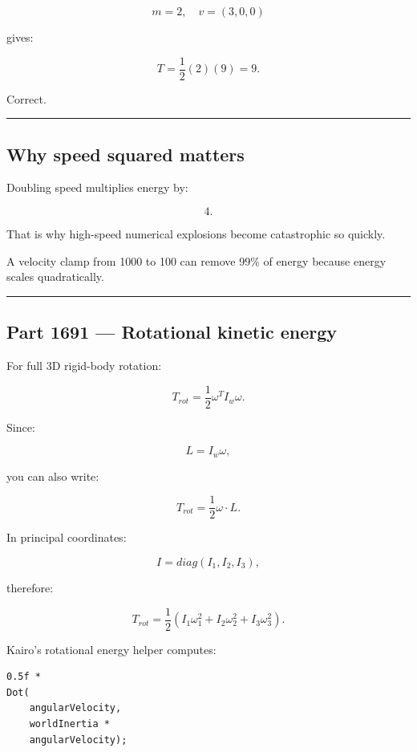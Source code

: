 \[
m=2,
\quad
v=(3,0,0)
\]

gives:

\[
T=
\frac12(2)(9)=9.
\]

Correct.

\begin{center}\rule{0.5\linewidth}{0.5pt}\end{center}

\subsection{Why speed squared matters}\label{06-engine-ii-ch039-why-speed-squared-matters}

Doubling speed multiplies energy by:

\[
4.
\]

That is why high-speed numerical explosions become catastrophic so quickly.

A velocity clamp from 1000 to 100 can remove 99\% of energy because energy scales quadratically.

\begin{center}\rule{0.5\linewidth}{0.5pt}\end{center}

\subsection{Part 1691 --- Rotational kinetic energy}\label{06-engine-ii-ch039-part-1691-rotational-kinetic-energy}

For full 3D rigid-body rotation:

\[
\boxed{
T_{rot}
=
\frac12
\omega^T
I_w
\omega.
}
\]

Since:

\[
L=I_w\omega,
\]

you can also write:

\[
\boxed{
T_{rot}
=
\frac12
\omega\cdot L.
}
\]

In principal coordinates:

\[
I=
diag(I_1,I_2,I_3),
\]

therefore:

\[
T_{rot}
=
\frac12
(
I_1\omega_1^2+
I_2\omega_2^2+
I_3\omega_3^2
).
\]

Kairo's rotational energy helper computes:

\begin{verbatim}
0.5f *
Dot(
    angularVelocity,
    worldInertia *
    angularVelocity);
\end{verbatim}

